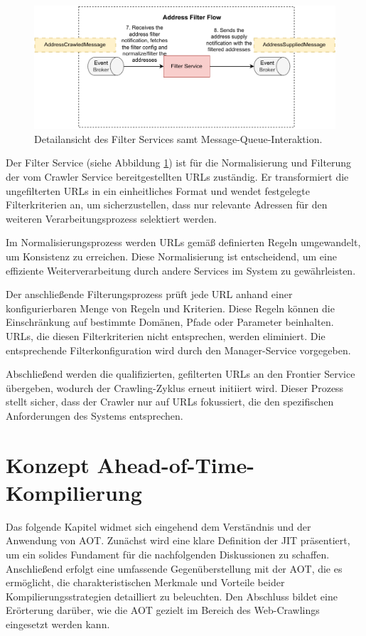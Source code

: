 \begin{figure}[H]
    \centering
    \includegraphics[width=14cm]{images/40_concept/FilterService.drawio.pdf}
    \caption[Detailansicht des Filter Services]{Detailansicht des Filter Services samt Message-Queue-Interaktion.}
    \label{fig:FilterService}
\end{figure}

Der Filter Service (siehe Abbildung \ref{fig:FilterService}) ist für die Normalisierung und Filterung der vom Crawler Service bereitgestellten URLs zuständig. Er transformiert die ungefilterten URLs in ein einheitliches Format und wendet festgelegte Filterkriterien an, um sicherzustellen, dass nur relevante Adressen für den weiteren Verarbeitungsprozess selektiert werden.

Im Normalisierungsprozess werden URLs gemäß definierten Regeln umgewandelt, um Konsistenz zu erreichen. Diese Normalisierung ist entscheidend, um eine effiziente Weiterverarbeitung durch andere Services im System zu gewährleisten.

Der anschließende Filterungsprozess prüft jede URL anhand einer konfigurierbaren Menge von Regeln und Kriterien. Diese Regeln können die Einschränkung auf bestimmte Domänen, Pfade oder Parameter beinhalten. URLs, die diesen Filterkriterien nicht entsprechen, werden eliminiert. Die entsprechende Filterkonfiguration wird durch den Manager-Service vorgegeben.

Abschließend werden die qualifizierten, gefilterten URLs an den Frontier Service übergeben, wodurch der Crawling-Zyklus erneut initiiert wird. Dieser Prozess stellt sicher, dass der Crawler nur auf URLs fokussiert, die den spezifischen Anforderungen des Systems entsprechen.


\section{Konzept Ahead-of-Time-Kompilierung} \label{sec:aot}
Das folgende Kapitel widmet sich eingehend dem Verständnis und der Anwendung von \acl{AOT}. Zunächst wird eine klare Definition der \acl{JIT} präsentiert, um ein solides Fundament für die nachfolgenden Diskussionen zu schaffen. Anschließend erfolgt eine umfassende Gegenüberstellung mit der \acl{AOT}, die es ermöglicht, die charakteristischen Merkmale und Vorteile beider Kompilierungsstrategien detailliert zu beleuchten. Den Abschluss bildet eine Erörterung darüber, wie die \acl{AOT} gezielt im Bereich des Web-Crawlings eingesetzt werden kann.

